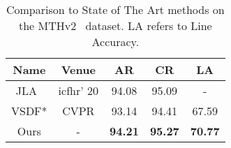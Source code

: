 \begin{table}[]
    \centering
    \caption{Comparison to State of The Art methods on the MTHv2~\cite{jla} dataset. LA refers to Line Accuracy.}

    \begin{tabular}{c|c|ccc}
        \hline
         Name & Venue & AR & \textbf{CR} & LA \\
         \hline
         JLA~\cite{jla}& icfhr' 20&94.08 & 95.09 & -\\
         \hline
         VSDF*\cite{vsdf}& CVPR &93.14 &94.41 &67.59 \\
         \hline
         Ours&- &\textbf{94.21} & \textbf{95.27} & \textbf{70.77} \\
        \hline
    \end{tabular}
    \label{tab:my_label}
\end{table}